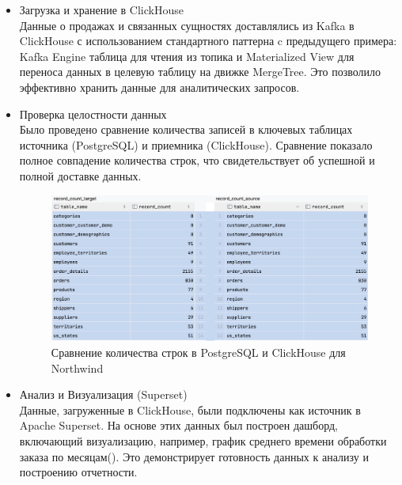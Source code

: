 \begin{enumerate}[1.]
\begin{itemize}
              \item Загрузка и хранение в ClickHouse\\
                    Данные о продажах и связанных сущностях доставлялись из Kafka в ClickHouse с использованием стандартного паттерна c предыдущего примера: Kafka Engine таблица для чтения из топика и Materialized View для переноса данных в целевую таблицу на движке MergeTree. Это позволило эффективно хранить данные для аналитических запросов.
              \item Проверка целостности данных\\
                    Было проведено сравнение количества записей в ключевых таблицах источника (PostgreSQL) и приемника (ClickHouse). Сравнение показало полное совпадение количества строк, что свидетельствует об успешной и полной доставке данных.
                    \begin{figure}[h]
                        \center
                        \includegraphics [scale=0.5] {my_folder/images/ex1_tables_ch_pg_compraring}
                        \caption{Сравнение количества строк в PostgreSQL и ClickHouse для Northwind}
                        \label{fig:ex1_tables_ch_pg_compraring}
                    \end{figure}
                    \FloatBarrier
              \item Анализ и Визуализация (Superset)\\
                    Данные, загруженные в ClickHouse, были подключены как источник в Apache Superset. На основе этих данных был построен дашборд, включающий визуализацию, например, график среднего времени обработки заказа по месяцам(). Это демонстрирует готовность данных к анализу и построению отчетности.                    \begin{figure}[h]
                        \center

\end{figure}
\end{itemize}
\end{enumerate}
